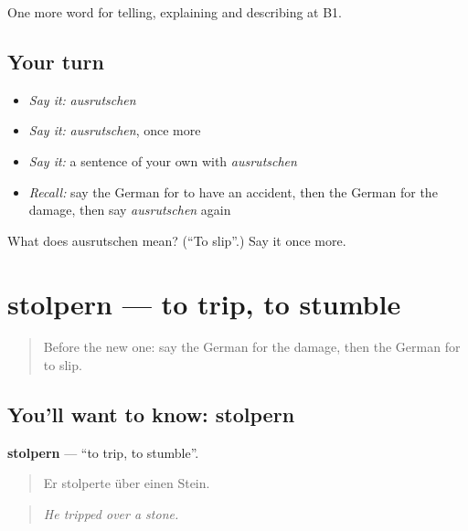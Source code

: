 \begin{grammarlens}[title={What you've built}]
One more word for telling, explaining and describing at B1.
\end{grammarlens}

\subsection*{Your turn}
\begin{itemize}
\raggedright
  \item \emph{Say it:} \emph{ausrutschen}
  \item \emph{Say it:} \emph{ausrutschen}, once more
  \item \emph{Say it:} a sentence of your own with \emph{ausrutschen}
  \item \emph{Recall:} say the German for to have an accident, then the German for the damage, then say \emph{ausrutschen} again
\end{itemize}

\begin{tcolorbox}[breakable,colback=teal!4,colframe=teal!35!black,title={Before you move on}]
What does ausrutschen mean? (\textquotedblleft{}To slip\textquotedblright{}.) Say it once more.
\end{tcolorbox}
\section[stolpern]{stolpern — to trip, to stumble}

\label{lesson:GE-C289-stolpern}



\begin{quote}
Before the new one: say the German for the damage, then the German for to slip.
\end{quote}

\subsection*{You'll want to know: stolpern}
\textbf{stolpern} — \textquotedblleft{}to trip, to stumble\textquotedblright{}.

\begin{quote}
Er stolperte über einen Stein.
\end{quote}

\begin{quote}
\emph{He tripped over a stone.}
\end{quote}

